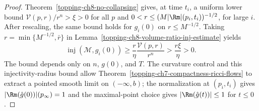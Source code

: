 \begin{proof}
\sketch Theorem~\ref{topping-ch8-no-collapsing} gives, at time $t_i$, a uniform lower bound
$\mathcal V(p,r)/r^n>\xi>0$ for all $p$ and
$0<r\leq(M|\Rm|(p_i,t_i))^{-1/2}$, for large $i$. After rescaling, the same
bound holds for $g_i(0)$ on $r\leq M^{-1/2}$. Taking
$r=\min\{M^{-1/2},\bar r\}$ in Lemma~\ref{topping-ch8-volume-ratio-inj-estimate} yields
\[
\operatorname{inj}(\mathcal M,g_i(0))
\geq\frac r\eta\frac{\mathcal V(p,r)}{r^n}
>\frac{r\xi}{\eta}>0.
\]
The bound depends only on $n$, $g(0)$, and $T$. The curvature control and this
injectivity-radius bound allow Theorem~\ref{topping-ch7-compactness-ricci-flows} to extract a pointed smooth limit
on $(-\infty,b)$; the normalization at $(p_i,t_i)$ gives
$|\Rm(\hat g(0))|(p_\infty)=1$ and the maximal-point choice gives
$|\Rm(\hat g(t))|\leq1$ for $t\leq0$.
\end{proof}
